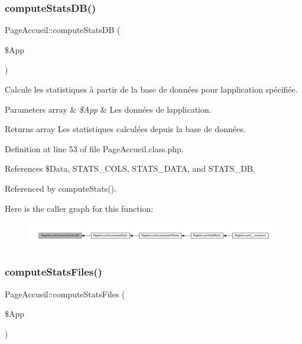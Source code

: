 \subsubsection{\texorpdfstring{compute\+Stats\+D\+B()}{computeStatsDB()}}
{\footnotesize\ttfamily Page\+Accueil\+::compute\+Stats\+DB (\begin{DoxyParamCaption}\item[{}]{\$\+App }\end{DoxyParamCaption})\hspace{0.3cm}{\ttfamily [protected]}}

Calcule les statistiques à partir de la base de données pour l\textquotesingle{}application spécifiée.


\begin{DoxyParams}[1]{Parameters}
array & {\em \$\+App} & Les données de l\textquotesingle{}application. \\
\hline
\end{DoxyParams}
\begin{DoxyReturn}{Returns}
array Les statistiques calculées depuis la base de données. 
\end{DoxyReturn}


Definition at line 53 of file Page\+Accueil.\+class.\+php.



References \$\+Data, S\+T\+A\+T\+S\+\_\+\+C\+O\+LS, S\+T\+A\+T\+S\+\_\+\+D\+A\+TA, and S\+T\+A\+T\+S\+\_\+\+DB.



Referenced by compute\+Stats().

Here is the caller graph for this function\+:\nopagebreak
\begin{figure}[H]
\begin{center}
\leavevmode
\includegraphics[width=350pt]{class_page_accueil_a9799218ddbc6dcdbc471e2a99efbe61a_icgraph}
\end{center}
\end{figure}
\mbox{\label{class_page_accueil_a53981e78427397fc56ec11e28d8f0bd3}} 
\subsubsection{\texorpdfstring{compute\+Stats\+Files()}{computeStatsFiles()}}
{\footnotesize\ttfamily Page\+Accueil\+::compute\+Stats\+Files (\begin{DoxyParamCaption}\item[{}]{\$\+App }\end{DoxyParamCaption})\hspace{0.3cm}{\ttfamily [protected]}}

